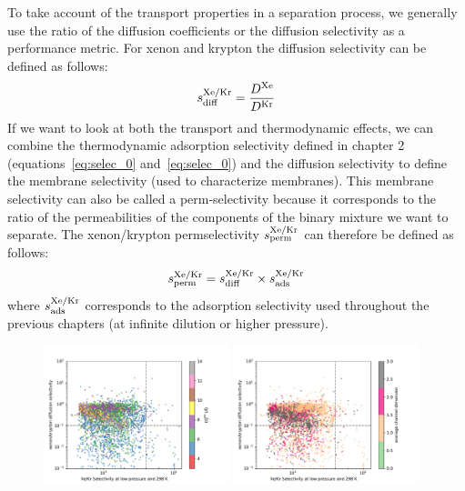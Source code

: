 \documentclass[main]{subfiles}
\begin{document}
To take account of the transport properties in a separation process, we generally use the ratio of the diffusion coefficients or the diffusion selectivity as a performance metric. For xenon and krypton the diffusion selectivity can be defined as follows:\autocite{Krishna_2010}
\begin{equation}
  s^{\text{Xe/Kr}}_{\text{diff}} = \frac{D^{\text{Xe}}}{D^{\text{Kr}}}
\end{equation}
If we want to look at both the transport and thermodynamic effects, we can combine the thermodynamic adsorption selectivity defined in chapter 2 (equations~\ref{eq:selec_0} and~\ref{eq:selec_0}) and the diffusion selectivity to define the membrane selectivity (used to characterize membranes). This membrane selectivity can also be called a perm-selectivity because it corresponds to the ratio of the permeabilities of the components of the binary mixture we want to separate. The xenon/krypton permselectivity $s^{\text{Xe/Kr}}_{\text{perm}}$ can therefore be defined as follows:
\begin{equation}\label{eq:membrane_selec}
  s^{\text{Xe/Kr}}_{\text{perm}} = s^{\text{Xe/Kr}}_{\text{diff}} \times s^{\text{Xe/Kr}}_{\text{ads}}
\end{equation}
where $s^{\text{Xe/Kr}}_{\text{ads}}$ corresponds to the adsorption selectivity used throughout the previous chapters (at infinite dilution or higher pressure). 

\begin{figure}[ht]
  \centering
    \includegraphics[width=0.48\textwidth]{figures/5-diffusion/diff_D_xekr-s0-lcd.pdf}
    \includegraphics[width=0.48\textwidth]{figures/5-diffusion/diff_D_xekr-s0-chandim.pdf}
    \caption{}\label{fgr:perm_selec0}
\end{figure}
\end{document}

